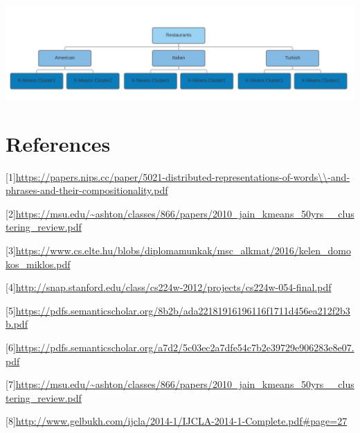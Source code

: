 \documentclass{article} %
\begin{document}
\begin{center}
  \includegraphics[width=\linewidth]{tablo.png}
\end{center}





\section{References}

[1]\url{https://papers.nips.cc/paper/5021-distributed-representations-of-words\\-and-phrases-and-their-compositionality.pdf} 

[2]\url{https://msu.edu/~ashton/classes/866/papers/2010_jain_kmeans_50yrs__clustering_review.pdf} 

[3]\url{https://www.cs.elte.hu/blobs/diplomamunkak/msc_alkmat/2016/kelen_domokos_miklos.pdf} 


[4]\url{http://snap.stanford.edu/class/cs224w-2012/projects/cs224w-054-final.pdf}
 

[5]\url{https://pdfs.semanticscholar.org/8b2b/ada22181916196116f1711d456ea212f2b3b.pdf}



[6]\url{https://pdfs.semanticscholar.org/a7d2/5c03ec2a7dfe54c7b2e39729e906283e8e07.pdf}


[7]\url{https://msu.edu/~ashton/classes/866/papers/2010_jain_kmeans_50yrs__clustering_review.pdf}


[8]\url{http://www.gelbukh.com/ijcla/2014-1/IJCLA-2014-1-Complete.pdf#page=27}
\end{document}
